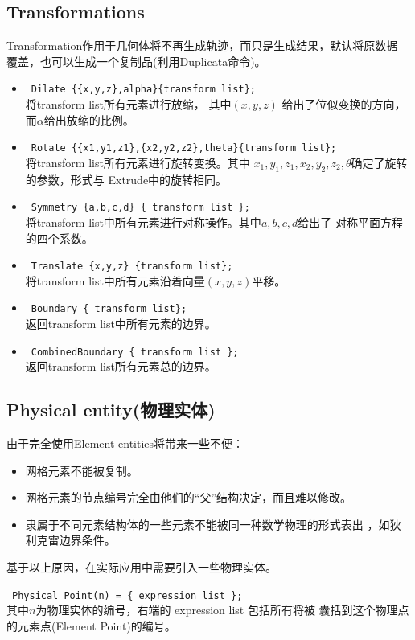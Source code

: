 \documentclass[a4paper,  11pt]{ctexart}
\begin{document}
\subsection{Transformations}
Transformation作用于几何体将不再生成轨迹，而只是生成结果，默认将原数据
覆盖，也可以生成一个复制品(利用Duplicata命令)。
\begin{itemize}
	\item ~\verb|Dilate {{x,y,z},alpha}{transform list};|~ \\
		将transform list所有元素进行放缩，
		其中$(x,y,z)$ 给出了位似变换的方向，
		而$\alpha$给出放缩的比例。
	\item 
	~\verb|Rotate {{x1,y1,z1},{x2,y2,z2},theta}{transform list}; |~ \\
		将transform list所有元素进行旋转变换。其中
		$x_1,y_1,z_1,x_2,y_2,z_2,\theta$确定了旋转的参数，形式与
		Extrude中的旋转相同。
	\item 
	~\verb|Symmetry {a,b,c,d} { transform list };|~\\
		将transform list中所有元素进行对称操作。其中$a,b,c,d$给出了
		对称平面方程的四个系数。
	\item ~\verb|Translate {x,y,z} {transform list};|~ \\
		将transform list中所有元素沿着向量$(x,y,z)$平移。
	\item ~\verb|Boundary { transform list};|~ \\
		返回transform list中所有元素的边界。
	\item ~\verb|CombinedBoundary { transform list };|~ \\
		返回transform list所有元素总的边界。
\end{itemize}
\subsection{Physical entity(物理实体)}
由于完全使用Element entities将带来一些不便：
\begin{itemize}
	\item 网格元素不能被复制。
	\item 网格元素的节点编号完全由他们的“父”结构决定，而且难以修改。
	\item 隶属于不同元素结构体的一些元素不能被同一种数学物理的形式表出
		，如狄利克雷边界条件。
\end{itemize}
基于以上原因，在实际应用中需要引入一些物理实体。\par
 ~\verb|Physical Point(n) = { expression list }; |~ \\
 其中$n$为物理实体的编号，右端的 expression list 包括所有将被
 囊括到这个物理点的元素点(Element Point)的编号。
\newpage
\end{document}
